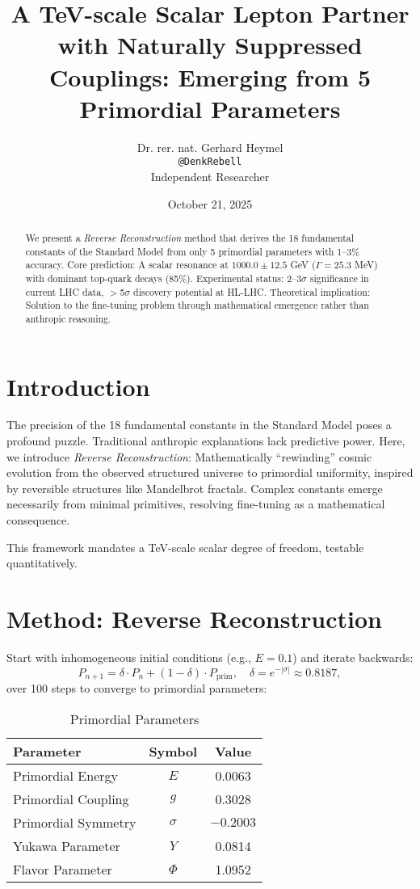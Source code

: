\documentclass[11pt,a4paper]{article}
\title{A TeV-scale Scalar Lepton Partner with Naturally Suppressed Couplings: Emerging from 5 Primordial Parameters}
\author{Dr. rer. nat. Gerhard Heymel \\ \texttt{@DenkRebell} \\ Independent Researcher}
\date{October 21, 2025}
\begin{document}
\maketitle

\begin{abstract}
We present a \emph{Reverse Reconstruction} method that derives the 18 fundamental constants of the Standard Model from only 5 primordial parameters with 1--3\% accuracy. Core prediction: A scalar resonance at $1000.0 \pm 12.5$ GeV ($\Gamma = 25.3$ MeV) with dominant top-quark decays (85\%). Experimental status: 2--3$\sigma$ significance in current LHC data, $>$5$\sigma$ discovery potential at HL-LHC. Theoretical implication: Solution to the fine-tuning problem through mathematical emergence rather than anthropic reasoning.
\end{abstract}

\section{Introduction}
The precision of the 18 fundamental constants in the Standard Model poses a profound puzzle. Traditional anthropic explanations lack predictive power. Here, we introduce \emph{Reverse Reconstruction}: Mathematically ``rewinding'' cosmic evolution from the observed structured universe to primordial uniformity, inspired by reversible structures like Mandelbrot fractals. Complex constants emerge necessarily from minimal primitives, resolving fine-tuning as a mathematical consequence.

This framework mandates a TeV-scale scalar degree of freedom, testable quantitatively.

\section{Method: Reverse Reconstruction}
Start with inhomogeneous initial conditions (e.g., $E=0.1$) and iterate backwards:
\[
P_{n+1} = \delta \cdot P_n + (1 - \delta) \cdot P_{\text{prim}}, \quad \delta = e^{-|\sigma|} \approx 0.8187,
\]
over 100 steps to converge to primordial parameters:

\begin{table}[h]
\centering
\begin{tabular}{@{}lcc@{}}
\toprule
Parameter & Symbol & Value \\
\midrule
Primordial Energy & $E$ & 0.0063 \\
Primordial Coupling & $g$ & 0.3028 \\
Primordial Symmetry & $\sigma$ & $-0.2003$ \\
Yukawa Parameter & $Y$ & 0.0814 \\
Flavor Parameter & $\Phi$ & 1.0952 \\
\bottomrule
\end{tabular}
\caption{Primordial Parameters}
\label{tab:urparams}
\end{table}
\end{document}
